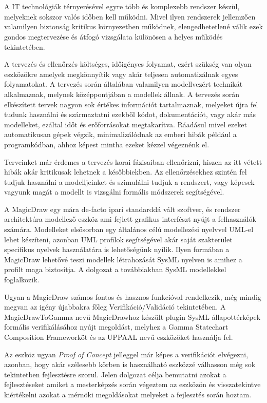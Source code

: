\chapter{\bevezetes}

A IT technológiák térnyerésével egyre több és komplexebb rendszer készül, melyeknek sokszor valós időben kell működni. Mivel ilyen rendszerek jellemzően valamilyen biztonság kritikus környezetben működnek, elengedhetetlené válik ezek gondos megtervezése és átfogó vizsgálata különösen a helyes működés tekintetében.

A tervezés és ellenőrzés költséges, időigényes folyamat, ezért szükség van olyan eszközökre amelyek megkönnyítik vagy akár teljesen automatizálnak egyes folyamatokat. A tervezés során általában valamilyen modellvezért technikát alkalmaznak, melynek középpontjában a modellek állnak. A tervezés során elkészített tervek nagyon sok értékes információt tartalmaznak, melyeket újra fel tudunk használni és származtatni ezekből kódot, dokumentációt, vagy akár más modelleket, ezáltal időt és erőforrásokat megtakarítva. Ráadásul mivel ezeket automatikusan gépek végzik, minimalizálódnak az emberi hibák például a programkódban, ahhoz képest mintha ezeket kézzel végeznénk el.

Terveinket már érdemes a tervezés korai fázisaiban ellenőrizni, hiszen az itt vétett hibák akár kritikusak lehetnek a későbbiekben. Az ellenőrzésekhez szintén fel tudjuk használni a modelljeinket és szimulálni tudjuk a rendszert, vagy képesek vagyunk magát a modellt is vizsgálni formális módszerek segítségével.

A MagicDraw egy mára de-facto ipari standarddá vált szoftver, és rendszer architektúra modellező eszköz ami fejlett grafikus interfészt nyújt a felhasználók számára. Modelleket elsősorban egy általános célú modellezési nyelvvel UML-el lehet készíteni, azonban UML profilok segítségével akár saját szakterület specifikus nyelvek használatára is lehetőségünk nyílik. Ilyen formában a MagicDraw lehetővé teszi modellek létrahozását SysML nyelven is amihez a profilt maga biztosítja. A dolgozat a továbbiakban SysML modellekkel foglalkozik.

Ugyan a MagicDraw számos fontos és hasznos funkcióval rendelkezik, még mindig megvan az igény újabbakra főleg Verifikáció/Validáció tekintetében. A MagicDrawToGamma nevű MagicDrawhoz készült plugin SysML állapottérképek formális verifikálásához nyújt megoldást, melyhez a Gamma Statechart Composition Frameworköt és az UPPAAL nevű eszközöket használja fel.

Az eszköz ugyan \emph{Proof of Concept} jelleggel már képes a verifikációt elvégezni, azonban, hogy akár szélesebb körben is használható eszközzé válhasson még sok tekintetben fejlesztésre szorul. Jelen dolgozat célja bemutatni azokat a fejlesztéseket amiket a mesterképzés során végeztem az eszközön és visszatekintve kiértékelni azokat a mérnöki megoldásokat melyeket a fejlesztés során hoztam.

